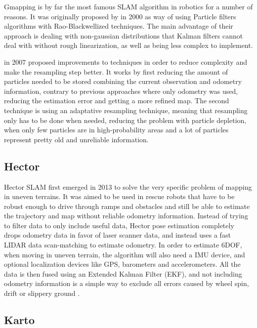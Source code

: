 Gmapping is by far the most famous SLAM algorithm in robotics for a number of reasons. It was originally proposed by \citeauthor{doucet2000rao} in 2000 as way of using Particle filters algorithms with Rao-Blackwellized techniques. The main advantage of their approach is dealing with non-gaussian distributions that Kalman filters cannot deal with without rough linearization, as well as being less complex to implement.

\citeauthor{grisetti2007improved} in 2007 proposed improvements to \citeauthor{doucet2000rao} techniques in order to reduce complexity and make the resampling step better. It works by first reducing the amount of particles needed to be stored combining the current observation and odometry information, contrary to previous approaches where only odometry was used, reducing the estimation error and getting a more refined map. The second technique is using an adaptative resampling technique, meaning that resampling only has to be done when needed, reducing the problem with particle depletion, when only few particles are in high-probability areas and a lot of particles represent pretty old and unreliable information.

\subsection{Hector}

Hector SLAM first emerged in 2013 to solve the very specific problem of mapping in uneven terrains. It was aimed to be used in rescue robots that have to be robust enough to drive through ramps and obstacles and still be able to estimate the trajectory and map without reliable odometry information. Instead of trying to filter data to only include useful data, Hector pose estimation completely drops odometry data in favor of laser scanner data, and instead uses a fast LIDAR data scan-matching to estimate odometry. In order to estimate 6DOF, when moving in uneven terrain, the algorithm will also need a IMU device, and optional localization devices  like GPS, barometers and accelerometers. All the data is then fused using an Extended Kalman Filter (EKF), and not including odometry information is a simple way to exclude all errors caused by wheel spin, drift or slippery ground \cite{kohlbrecher2011flexible}.

\subsection{Karto}

